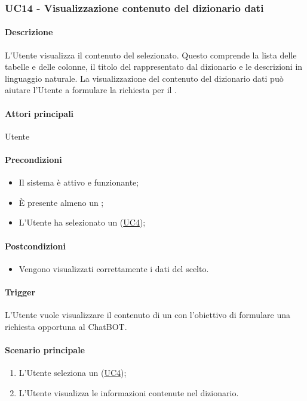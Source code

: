 \subsubsection{UC14 - Visualizzazione contenuto del dizionario dati}\label{UC14}
\paragraph*{Descrizione}
L'Utente visualizza il contenuto del  selezionato. Questo comprende la lista delle tabelle e delle colonne, il titolo del  rappresentato dal dizionario e le descrizioni in linguaggio naturale. La visualizzazione del contenuto del dizionario dati può aiutare l'Utente a formulare la richiesta per il .

\paragraph*{Attori principali}
Utente

\paragraph*{Precondizioni}
\begin{itemize}
  \item Il sistema è attivo e funzionante;
  \item È presente almeno un ;
  \item L'Utente ha selezionato un  (\hyperref[UC4]{UC4});
\end{itemize}

\paragraph*{Postcondizioni}
\begin{itemize}
  \item Vengono visualizzati correttamente i dati del  scelto.
\end{itemize}

\paragraph*{Trigger}
L'Utente vuole visualizzare il contenuto di un  con l'obiettivo di formulare una richiesta opportuna al ChatBOT.

\paragraph*{Scenario principale}
\begin{enumerate}
  \item L'Utente seleziona un  (\hyperref[UC4]{UC4});
  \item L'Utente visualizza le informazioni contenute nel dizionario.
\end{enumerate}

